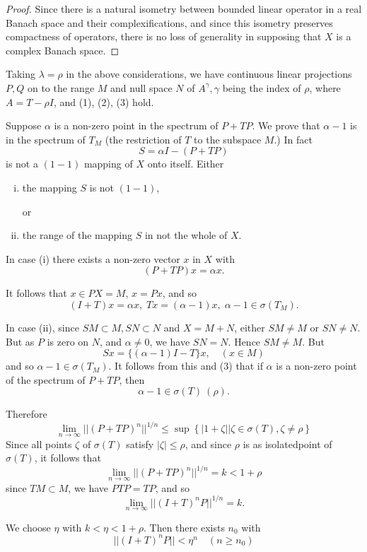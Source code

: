 \begin{proof}
  Since there is a natural isometry between bounded linear operator in
  a real Banach space and their complexifications, and since this
  isometry preserves compactness of operators, there is no loss of
  generality in supposing that $X$ is a complex Banach space. 
\end{proof}

Taking $\lambda = \rho$ in the above considerations, we have
continuous linear projections $P,Q$ on to the range $M$ and null space
$N$ of $A^\gamma, \gamma$ being the index of $\rho$, where $A = T -\rho I$,
and (1), (2), (3) hold. 

Suppose $\alpha$ is a non-zero point in the spectrum of $P+TP$. We
prove that $\alpha -1$ is in the spectrum of $T_M$ (the restriction of
$T$ to the subspace $M$.) In fact 
$$
S = \alpha I - (P + T P)
$$\pageoriginale
is not a $(1-1)$ mapping of $X$ onto itself. Either
\begin{enumerate}[i)]
\item the mapping $S$ is not $(1-1)$, 

or
\item the range of the mapping $S$ in not the whole of $X$.
\end{enumerate}

In case (i) there exists a non-zero vector $x$ in $X$ with 
$$
(P + TP)x = \alpha x.
$$

It follows that $x \in PX = M$, $x = Px$, and so
$$
(I+T)x = \alpha x, \; Tx = (\alpha -1)x, \; \alpha-1 \in \sigma 
(T_M). 
$$

In case (ii), since $SM \subset M,SN \subset N$ and $X = M+N$,
either $SM \neq M$ or $SN \neq N$. But as $P$ is zero on $N$, and
$\alpha \neq 0$, we have $SN = N$. Hence $SM \neq M$. But 
$$
Sx = \{(\alpha-1) I -T \}x, \quad (x \in M)
$$
and so $\alpha-1 \in \sigma (T_M)$. It follows from this and
(3) that if $\alpha$ is a non-zero point of the spectrum of $P+TP$,
then 
$$
\alpha -1 \in \sigma (T) \ (\rho).
$$

Therefore
$$
\lim_{n \to \infty} || (P+TP)^n ||^{1/n} \le \sup \left\{ |1+\zeta| |
\zeta \in \sigma (T), \zeta \neq \rho\right\} 
$$
Since all points $\zeta$ of $\sigma(T)$ satisfy $|\zeta| \le \rho$,
and since $\rho$ is as isolated\pageoriginale point of $\sigma (T)$,
it follows that   
$$
\lim_{n \to \infty} ||(P+TP)^n||^{1/n} = k < 1 + \rho
$$
since $TM \subset M$, we have $PTP = TP$, and so 
$$
\lim_{n \to \infty} ||(I+T)^n P ||^{1/n} = k.
$$

We choose $\eta$ with $k < \eta < 1 + \rho$. Then there exists $n_0$ with
\begin{equation}
||(I + T)^n P || < \eta^n \quad (n \ge n_0) \tag{1}
\end{equation}

